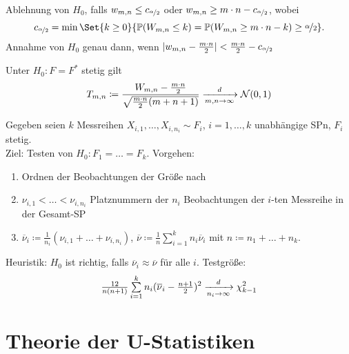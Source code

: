 \documentclass{cheat-sheet}
\renewcommand{\P}{\mathbb{P}} %
\newcommand{\Normal}{\mathcal{N}} %
\begin{document}
\begin{entscheidungsregel}
  Ablehnung von $H_0$, falls $w_{m,n} \leq c_{\nicefrac{\alpha}{2}}$ oder $w_{m,n} \geq m \cdot n - c_{\nicefrac{\alpha}{2}}$, wobei
  \[
    c_{\nicefrac{\alpha}{2}} = \min \Set{k \geq 0}{\P(W_{m,n} \leq k) = \P(W_{m,n} \geq m \cdot n - k) \geq \nicefrac{\alpha}{2}}.
  \]
  Annahme von $H_0$ genau dann, wenn $\lvert w_{m,n} - \tfrac{m \cdot n}{2}\rvert < \tfrac{m \cdot n}{2} - c_{\nicefrac{\alpha}{2}}$
\end{entscheidungsregel}

\begin{satz}
  Unter $H_0 : F = F^{*}$ stetig gilt
  \[ T_{m,n} \coloneqq \frac{W_{m,n} - \tfrac{m \cdot n}{2}}{\sqrt{\tfrac{m \cdot n}{2} (m + n + 1)}} \xra[m, n \to \infty]{d} \Normal(0, 1) \]
\end{satz}


\begin{samepage}

\begin{bem}
  Gegeben seien $k$ Messreihen $X_{i,1}, \ldots, X_{i,n_i} \sim F_i$, $i = 1, \ldots, k$ unabhängige SPn, $F_i$ stetig. \\
  Ziel: Testen von $H_0 : F_1 = \ldots = F_k$.
  Vorgehen:
  \begin{enumerate}
    \item Ordnen der Beobachtungen der Größe nach
    \item $\nu_{i,1} < \ldots < \nu_{i,n_i}$ Platznummern der $n_i$ Beobachtungen der $i$-ten Messreihe in der Gesamt-SP
    \item $\overline{\nu}_i \coloneqq \tfrac{1}{n_i} (\nu_{i,1} + \ldots + \nu_{i,n_i})$, $\overline{\nu} \coloneqq \tfrac{1}{n} \sum_{i=1}^k n_i \overline{\nu}_i$ mit $n \coloneqq n_1 + \ldots + n_k$.
  \end{enumerate}
  Heuristik: $H_0$ ist richtig, falls $\overline{\nu}_i \approx \overline{\nu}$ für alle $i$.
  Testgröße:
  \[ \tfrac{12}{n (n+1)} \sum_{i=1}^k n_i (\overline{\nu}_i - \tfrac{n+1}{2})^2 \xra[n_i \to \infty]{d} \chi^2_{k-1} \]
\end{bem}


\section{Theorie der U-Statistiken}

\end{samepage}
\end{document}
